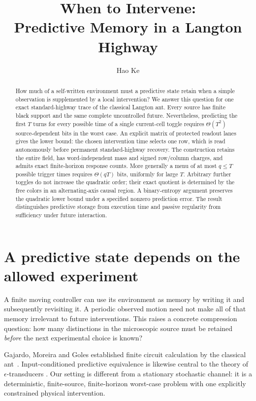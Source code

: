 \documentclass[11pt]{article}
\title{When to Intervene:\\Predictive Memory in a Langton Highway}
\author{Hao Ke}
\date{}
\theoremstyle{definition}\newtheorem{definition}[theorem]{Definition}
\begin{document}
\maketitle
\begin{abstract}
How much of a self-written environment must a predictive state retain when a
simple observation is supplemented by a local intervention? We answer this
question for one exact standard-highway trace of the classical Langton ant.
Every source has finite black support and the same complete uncontrolled future.
Nevertheless, predicting the first $T$ turns for every possible time of a single
current-cell toggle requires $\Theta(T^2)$ source-dependent bits in the worst
case. An explicit matrix of protected readout lanes gives the lower bound:
the chosen intervention time selects one row, which is read autonomously before
permanent standard-highway recovery. The construction retains the entire field,
has word-independent mass and signed row/column charges, and admits exact
finite-horizon response counts. More generally a menu of at most $q\le T$
possible trigger times requires $\Theta(qT)$ bits, uniformly for large $T$. Arbitrary further toggles do not increase the
quadratic order; their exact quotient is determined by the free colors in an
alternating-axis causal region. A binary-entropy argument preserves the quadratic
lower bound under a specified nonzero prediction error. The result distinguishes
predictive storage from execution time and passive regularity from sufficiency
under future interaction.
\end{abstract}

\section{A predictive state depends on the allowed experiment}
A finite moving controller can use its environment as memory by writing it and
subsequently revisiting it. A periodic observed motion need not make all of that
memory irrelevant to future interventions. This raises a concrete compression
question: how many distinctions in the microscopic source must be retained
\emph{before} the next experimental choice is known?

Gajardo, Moreira and Goles established finite circuit calculation by the
classical ant~\cite{gmg}.
Input-conditioned predictive equivalence is likewise central to the theory of
$\epsilon$-transducers \cite{bc}. Our setting is different from a stationary
stochastic channel: it is a deterministic, finite-source, finite-horizon
worst-case problem with one explicitly constrained physical intervention.
\end{document}
